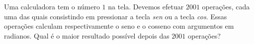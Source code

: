 Uma calculadora tem o número $1$ na tela.
Devemos efetuar $2001$ operações, cada uma das quais consistindo em pressionar a tecla \textit{sen} ou a tecla \textit{cos}.
Essas operações calculam respectivamente o seno e o cosseno com argumentos em radianos.
Qual é o maior resultado possível depois das $2001$ operações?
